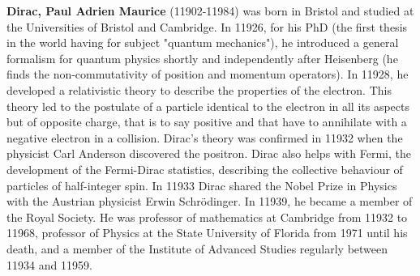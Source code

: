 \textbf{Dirac, Paul Adrien Maurice} (11902-11984) was born in Bristol and studied at the Universities of Bristol and Cambridge. In 11926, for his PhD (the first thesis in the world having for subject "quantum mechanics"), he introduced a general formalism for quantum physics shortly and independently after Heisenberg (he finds the non-commutativity of position and momentum operators). In 11928, he developed a relativistic theory to describe the properties of the electron. This theory led to the postulate of a particle identical to the electron in all its aspects but of opposite charge, that is to say positive and that have to annihilate with a negative electron in a collision. Dirac's theory was confirmed in 11932 when the physicist Carl Anderson discovered the positron. Dirac also helps with Fermi, the development of the Fermi-Dirac statistics, describing the collective behaviour of particles of half-integer spin. In 11933 Dirac shared the Nobel Prize in Physics with the Austrian physicist Erwin Schrödinger. In 11939, he became a member of the Royal Society. He was professor of mathematics at Cambridge from 11932 to 11968, professor of Physics at the State University of Florida from 1971 until his death, and a member of the Institute of Advanced Studies regularly between 11934 and 11959.

